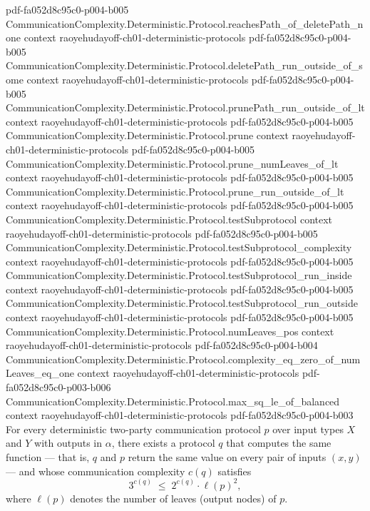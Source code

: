 \begin{theorem}
  {pdf-fa052d8c95c0-p004-b005}
\proofstep
  {CommunicationComplexity.Deterministic.Protocol.reachesPath_of_deletePath_none}
  {context}
  {raoyehudayoff-ch01-deterministic-protocols}
  {pdf-fa052d8c95c0-p004-b005}
\proofstep
  {CommunicationComplexity.Deterministic.Protocol.deletePath_run_outside_of_some}
  {context}
  {raoyehudayoff-ch01-deterministic-protocols}
  {pdf-fa052d8c95c0-p004-b005}
\proofstep
  {CommunicationComplexity.Deterministic.Protocol.prunePath_run_outside_of_lt}
  {context}
  {raoyehudayoff-ch01-deterministic-protocols}
  {pdf-fa052d8c95c0-p004-b005}
\proofstep
  {CommunicationComplexity.Deterministic.Protocol.prune}
  {context}
  {raoyehudayoff-ch01-deterministic-protocols}
  {pdf-fa052d8c95c0-p004-b005}
\proofstep
  {CommunicationComplexity.Deterministic.Protocol.prune_numLeaves_of_lt}
  {context}
  {raoyehudayoff-ch01-deterministic-protocols}
  {pdf-fa052d8c95c0-p004-b005}
\proofstep
  {CommunicationComplexity.Deterministic.Protocol.prune_run_outside_of_lt}
  {context}
  {raoyehudayoff-ch01-deterministic-protocols}
  {pdf-fa052d8c95c0-p004-b005}
\proofstep
  {CommunicationComplexity.Deterministic.Protocol.testSubprotocol}
  {context}
  {raoyehudayoff-ch01-deterministic-protocols}
  {pdf-fa052d8c95c0-p004-b005}
\proofstep
  {CommunicationComplexity.Deterministic.Protocol.testSubprotocol_complexity}
  {context}
  {raoyehudayoff-ch01-deterministic-protocols}
  {pdf-fa052d8c95c0-p004-b005}
\proofstep
  {CommunicationComplexity.Deterministic.Protocol.testSubprotocol_run_inside}
  {context}
  {raoyehudayoff-ch01-deterministic-protocols}
  {pdf-fa052d8c95c0-p004-b005}
\proofstep
  {CommunicationComplexity.Deterministic.Protocol.testSubprotocol_run_outside}
  {context}
  {raoyehudayoff-ch01-deterministic-protocols}
  {pdf-fa052d8c95c0-p004-b005}
\proofstep
  {CommunicationComplexity.Deterministic.Protocol.numLeaves_pos}
  {context}
  {raoyehudayoff-ch01-deterministic-protocols}
  {pdf-fa052d8c95c0-p004-b004}
\proofstep
  {CommunicationComplexity.Deterministic.Protocol.complexity_eq_zero_of_numLeaves_eq_one}
  {context}
  {raoyehudayoff-ch01-deterministic-protocols}
  {pdf-fa052d8c95c0-p003-b006}
\proofstep
  {CommunicationComplexity.Deterministic.Protocol.max_sq_le_of_balanced}
  {context}
  {raoyehudayoff-ch01-deterministic-protocols}
  {pdf-fa052d8c95c0-p004-b003}
For every deterministic two-party communication protocol $p$ over input types $X$ and
$Y$ with outputs in $\alpha$, there exists a protocol $q$ that computes the same
function — that is, $q$ and $p$ return the same value on every pair of inputs $(x,y)$ —
and whose communication complexity $c(q)$ satisfies
\[
  3^{c(q)} \;\le\; 2^{c(q)} \cdot \ell(p)^{2},
\]
where $\ell(p)$ denotes the number of leaves (output nodes) of $p$.
\end{theorem}


